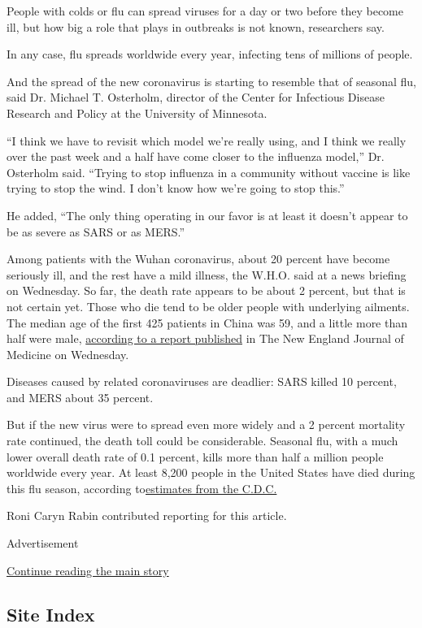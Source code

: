 People with colds or flu can spread viruses for a day or two before they
become ill, but how big a role that plays in outbreaks is not known,
researchers say.

In any case, flu spreads worldwide every year, infecting tens of
millions of people.

And the spread of the new coronavirus is starting to resemble that of
seasonal flu, said Dr. Michael T. Osterholm, director of the Center for
Infectious Disease Research and Policy at the University of Minnesota.

``I think we have to revisit which model we're really using, and I think
we really over the past week and a half have come closer to the
influenza model,'' Dr. Osterholm said. ``Trying to stop influenza in a
community without vaccine is like trying to stop the wind. I don't know
how we're going to stop this.''

He added, ``The only thing operating in our favor is at least it doesn't
appear to be as severe as SARS or as MERS.''

Among patients with the Wuhan coronavirus, about 20 percent have become
seriously ill, and the rest have a mild illness, the W.H.O. said at a
news briefing on Wednesday. So far, the death rate appears to be about 2
percent, but that is not certain yet. Those who die tend to be older
people with underlying ailments. The median age of the first 425
patients in China was 59, and a little more than half were male,
\href{https://cdf.nejm.org/services/GetOnlineFirstPDF.aspx?DOI=NEJMoa2001316}{according
to a report published} in The New England Journal of Medicine on
Wednesday.

Diseases caused by related coronaviruses are deadlier: SARS killed 10
percent, and MERS about 35 percent.

But if the new virus were to spread even more widely and a 2 percent
mortality rate continued, the death toll could be considerable. Seasonal
flu, with a much lower overall death rate of 0.1 percent, kills more
than half a million people worldwide every year. At least 8,200 people
in the United States have died during this flu season, according
to\href{https://www.cdc.gov/flu/weekly/index.htm}{estimates from the
C.D.C.}

Roni Caryn Rabin contributed reporting for this article.

Advertisement

\protect\hyperlink{after-bottom}{Continue reading the main story}

\hypertarget{site-index}{%
\subsection{Site Index}\label{site-index}}

